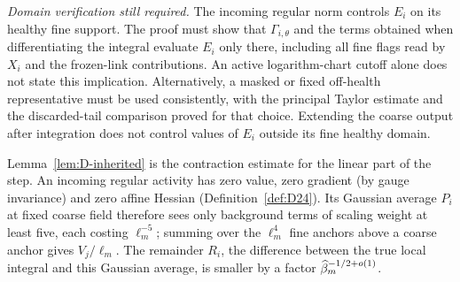 \emph{Domain verification still required.} The incoming regular norm controls $E_i$ on its healthy fine support. The proof must show that $\Gamma_{i,\theta}$ and the terms obtained when differentiating the integral evaluate $E_i$ only there, including all fine flags read by $X_i$ and the frozen-link contributions. An active logarithm-chart cutoff alone does not state this implication. Alternatively, a masked or fixed off-health representative must be used consistently, with the principal Taylor estimate and the discarded-tail comparison proved for that choice. Extending the coarse output after integration does not control values of $E_i$ outside its fine healthy domain.

Lemma~\ref{lem:D-inherited} is the contraction estimate for the linear part of the step. An incoming regular activity has zero value, zero gradient (by gauge invariance) and zero affine Hessian (Definition~\ref{def:D24}). Its Gaussian average $P_i$ at fixed coarse field therefore sees only background terms of scaling weight at least five, each costing $\ell_m^{-5}$; summing over the $\ell_m^4$ fine anchors above a coarse anchor gives $V_j/\ell_m$. The remainder $R_i$, the difference between the true local integral and this Gaussian average, is smaller by a factor $\widehat{\beta}_m^{-1/2+o(1)}$.


